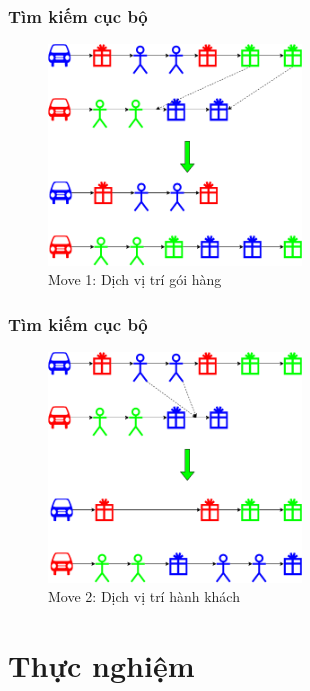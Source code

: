 \documentclass{beamer}
\begin{document}
	\begin{frame}
		\frametitle{Tìm kiếm cục bộ}
		\begin{figure}
			\centering
			\caption{Move 1: Dịch vị trí gói hàng}
			\includegraphics[width=0.6\textwidth]{images/cbls-good.png}
		\end{figure}
	\end{frame}

	\begin{frame}
		\frametitle{Tìm kiếm cục bộ}
		\begin{figure}
			\centering
			\caption{Move 2: Dịch vị trí hành khách}
			\includegraphics[width=0.6\textwidth]{images/cbls-people.png}
		\end{figure}
	\end{frame}
	
	\section{Thực nghiệm}
	



	
\end{document}
